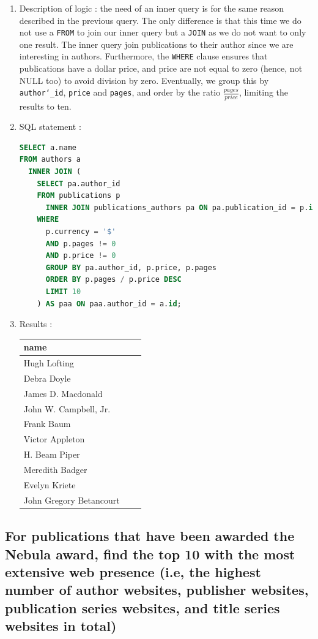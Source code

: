 \documentclass[doubleside, titlepage]{article}
\begin{document}
	\begin{enumerate}
	\item Description of logic : the need of an inner query is for the same reason described in the previous query. The only difference is that this time we do not use a \texttt{FROM} to join our inner query but a \texttt{JOIN} as we do not want to only one result. The inner query join publications to their author since we are interesting in authors. Furthermore, the \texttt{WHERE} clause ensures that publications have a dollar price, and price are not equal to zero (hence, not NULL too) to avoid division by zero. Eventually, we group this by \texttt{author\char`_id}, \texttt{price} and \texttt{pages}, and order by the ratio $\frac{pages}{price}$, limiting the results to ten.
	\item SQL statement :
		\begin{lstlisting}[language=SQL,showspaces=false,basicstyle=\ttfamily,numberstyle=\tiny,commentstyle=\color{gray}]
SELECT a.name
FROM authors a
  INNER JOIN (
    SELECT pa.author_id
    FROM publications p
      INNER JOIN publications_authors pa ON pa.publication_id = p.id
    WHERE
      p.currency = '$'
      AND p.pages != 0
      AND p.price != 0
      GROUP BY pa.author_id, p.price, p.pages
      ORDER BY p.pages / p.price DESC
      LIMIT 10
	) AS paa ON paa.author_id = a.id;
		\end{lstlisting}

	\item Results :\\

	\begin{tabular}{|l|c|r|}
	  \hline
		name\\
	  \hline
Hugh Lofting\\
Debra Doyle\\
James D. Macdonald\\
John W. Campbell, Jr.\\
Frank Baum\\
Victor Appleton\\
H. Beam Piper\\
Meredith Badger\\
Evelyn Kriete\\
John Gregory Betancourt\\
	  \hline
	\end{tabular}
\end{enumerate}

\subsection{For publications that have been awarded the Nebula award, find the top 10 with the most extensive web presence  (i.e, the highest number of author websites, publisher websites, publication series websites, and title series websites in total)}
\end{document}
